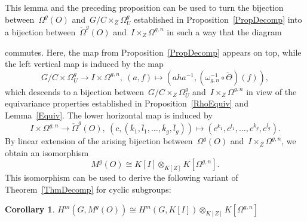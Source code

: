 \documentclass[12pt]{article}
\theoremstyle{definition}
\newtheorem{Cor}[Satz]{Corollary}
\theoremstyle{break}
\renewcommand{\1}{\mathbbm{1}}
\newcommand{\ot}{\mathbin{\otimes}}
\begin{document}
This lemma and the preceding proposition can be used to turn the bijection
between~$\Omega^g(O)$ and~$G/C \times_Z \Omega^g_U$ established in Proposition~\ref{PropDecomp} into a bijection
between~$\check{\Omega}^g(O)$ and~$I \times_Z \Omega^{g,n}$ in such a way that the diagram
\begin{center}
\end{center}
commutes. Here, the map from Proposition~\ref{PropDecomp} appears on top, while the left vertical map is induced by the map
\[G/C \times \Omega^g_{U} \to I \times \Omega^{g,n},~(a, f) \mapsto
(a h a^{-1}, (\omega_{g,n}^{-1} \circ \check{\Theta})(f)),\]
which descends to a bijection between~$G/C \times_Z \Omega^g_{U}$
and~$I \times_Z \Omega^{g,n}$ in view of the equivariance properties established in Proposition~\ref{RhoEquiv} and Lemma~\ref{Equiv}.
The lower horizontal map is induced by
\[I \times \Omega^{g,n} \to \check{\Omega}^g(O),~(c,(\bar{k}_1, \bar{l}_1,\ldots, \bar{k}_g, \bar{l}_g))
\mapsto (c^{k_1}, c^{l_1}, \ldots, c^{k_g}, c^{l_g}).\]
By linear extension of the arising bijection between~$\Omega^g(O)$ and~$I \times_Z \Omega^{g,n}$, we obtain an isomorphism
\[M^g(O) \cong K[I] \otimes_{K[Z]} K[\Omega^{g,n}].\]
This isomorphism can be used to derive the following variant of Theorem~\ref{ThmDecomp} for cyclic subgroups:
\begin{Cor} \label{DecompCohCyl}
$H^m(G,M^g(O)) \cong H^m(G,K[I]) \ot_{K[Z]} K[\Omega^{g,n}]$
\end{Cor}
\end{document}
